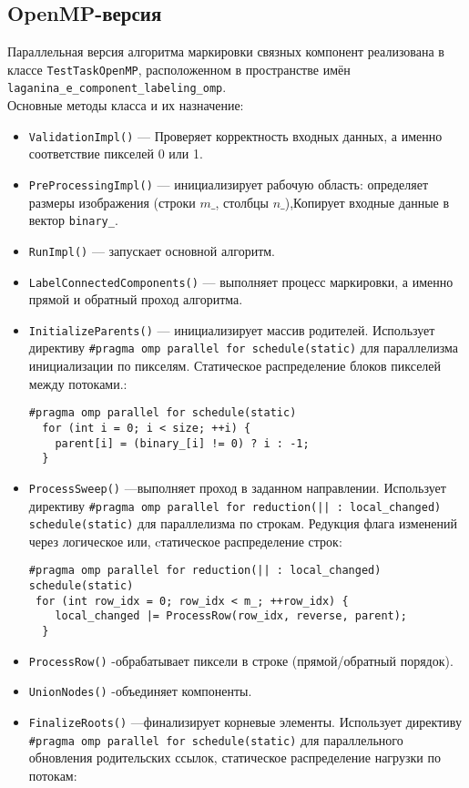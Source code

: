 \documentclass[12pt]{extarticle}
\begin{document}
\subsection{OpenMP-версия}

\hspace*{1.25cm}Параллельная версия алгоритма маркировки связных компонент реализована в классе \texttt{TestTaskOpenMP}, расположенном в пространстве имён \texttt{laganina\_e\_component\_labeling\_omp}. \\[-0.2cm]

Основные методы класса и их назначение:
\begin{itemize}
    \item \texttt{ValidationImpl()} — Проверяет корректность входных данных, а именно соответствие пикселей 0 или 1.
    \item \texttt{PreProcessingImpl()} — инициализирует рабочую область: определяет размеры изображения (строки $m\_$, столбцы $n\_$),Копирует входные данные в вектор \texttt{binary\_}.
    \item \texttt{RunImpl()} — запускает основной алгоритм.
    \item \texttt{LabelConnectedComponents()} — выполняет процесс маркировки, а именно прямой и обратный проход алгоритма.
    \item \texttt{InitializeParents()} — инициализирует массив родителей. Использует директиву \texttt{\#pragma omp parallel for schedule(static)} для параллелизма инициализации по пикселям. Статическое распределение блоков пикселей между потоками.:

    \begin{lstlisting}[caption={Параллельная по пикселям инициализация в методе InitializeParents},label={all00}]
#pragma omp parallel for schedule(static)
  for (int i = 0; i < size; ++i) {
    parent[i] = (binary_[i] != 0) ? i : -1;
  }
    \end{lstlisting}
    \item \texttt{ProcessSweep()} —выполняет проход в заданном направлении. Использует директиву \texttt{\#pragma omp parallel for reduction(|| : local\_changed) schedule(static)} для параллелизма по строкам. Редукция флага изменений через логическое или, cтатическое распределение строк:

    \begin{lstlisting}[caption={Параллельная по по строкам редукция флага изменений в методе ProcessSweep},label={all0}]
#pragma omp parallel for reduction(|| : local_changed) schedule(static)
 for (int row_idx = 0; row_idx < m_; ++row_idx) {
    local_changed |= ProcessRow(row_idx, reverse, parent);
  }
    \end{lstlisting}
    \item \texttt{ProcessRow()} -обрабатывает пиксели в строке (прямой/обратный порядок).
    \item \texttt{UnionNodes()} -объединяет компоненты.
     \item \texttt{FinalizeRoots()} —финализирует корневые элементы. Использует директиву \texttt{\#pragma omp parallel for schedule(static)} для параллельного обновления родительских ссылок, статическое распределение нагрузки по потокам:


\end{itemize}
\end{document}
